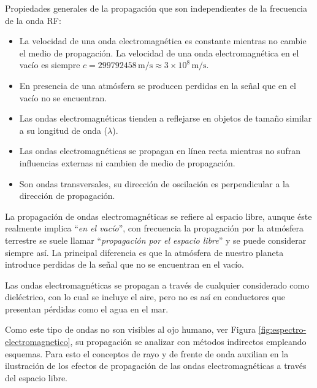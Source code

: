 \begin{tcolorbox}{Propiedades generales de la propagaci\'on que son independientes de la frecuencia de la onda RF:}{\small
  \begin{itemize}

  \item La velocidad de una onda electromagn\'etica es constante
    mientras no cambie el medio de propagaci\'on.
 La velocidad de una onda electromagn\'etica en el vac\'io es
    siempre $c = 299792458 \,\text{m/s} \approx 3 \times 10^8 \,\text{m/s}$.

  \item En presencia de una atmósfera se producen perdidas en la señal que en el vacío no se encuentran.

  \item Las ondas electromagn\'eticas tienden a reflejarse en objetos
    de tama\~no similar a su longitud de onda ($\lambda$).

  \item Las ondas electromagn\'eticas se propagan en l\'inea recta
    mientras no sufran influencias externas ni cambien de medio de
    propagaci\'on.

  \item Son ondas transversales, su direcci\'on de oscilaci\'on es perpendicular a la direcci\'on de propagaci\'on.
  \end{itemize}
  }
\end{tcolorbox}

La propagación de ondas  electromagnéticas se refiere al espacio libre, aunque \'este realmente 
implica ``\emph{en el vacío}'', con frecuencia la
propagación por la atmósfera terrestre se suele llamar ``\emph{propagación por el espacio libre}''
 y se puede considerar siempre así. 
La principal diferencia es que la atmósfera de nuestro planeta introduce
perdidas de la señal que no se encuentran en el vacío.

Las ondas electromagnéticas se propagan a través de cualquier considerado como  dieléctrico,
con lo cual se incluye el aire, pero no es as\'i en conductores que presentan p\'erdidas como el
agua en el mar.

Como este tipo de ondas no son visibles al ojo humano, ver Figura \ref{fig:espectro-electromagnetico},
 su propagaci\'on  se  analizar con métodos indirectos empleando esquemas. 
Para esto el conceptos de rayo y de frente de onda auxilian en la ilustraci\'on
de los efectos de propagación de las ondas electromagnéticas a través
del espacio libre. 

